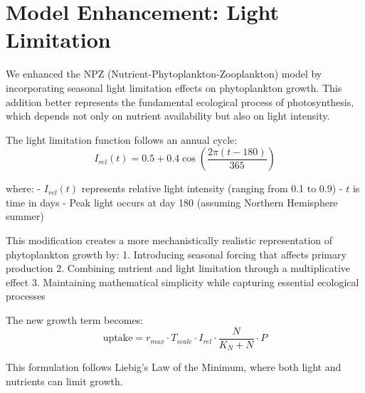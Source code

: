 \section{Model Enhancement: Light Limitation}

We enhanced the NPZ (Nutrient-Phytoplankton-Zooplankton) model by incorporating seasonal light limitation effects on phytoplankton growth. This addition better represents the fundamental ecological process of photosynthesis, which depends not only on nutrient availability but also on light intensity.

The light limitation function follows an annual cycle:
\[ I_{rel}(t) = 0.5 + 0.4\cos\left(\frac{2\pi(t-180)}{365}\right) \]

where:
- $I_{rel}(t)$ represents relative light intensity (ranging from 0.1 to 0.9)
- $t$ is time in days
- Peak light occurs at day 180 (assuming Northern Hemisphere summer)

This modification creates a more mechanistically realistic representation of phytoplankton growth by:
1. Introducing seasonal forcing that affects primary production
2. Combining nutrient and light limitation through a multiplicative effect
3. Maintaining mathematical simplicity while capturing essential ecological processes

The new growth term becomes:
\[ \text{uptake} = r_{max} \cdot T_{scale} \cdot I_{rel} \cdot \frac{N}{K_N + N} \cdot P \]

This formulation follows Liebig's Law of the Minimum, where both light and nutrients can limit growth.
